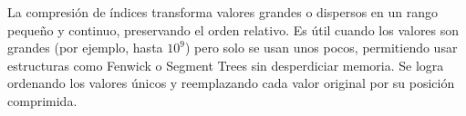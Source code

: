 {}
\markdownRendererSectionEnd \markdownRendererSectionBegin
{}\markdownRendererInterblockSeparator
{}La compresión de índices transforma valores grandes o dispersos en un rango pequeño y continuo, preservando el orden relativo. Es útil cuando los valores son grandes (por ejemplo, hasta $10^9$) pero solo se usan unos pocos, permitiendo usar estructuras como Fenwick o Segment Trees sin desperdiciar memoria. Se logra ordenando los valores únicos y reemplazando cada valor original por su posición comprimida.\markdownRendererInterblockSeparator
{}
\markdownRendererSectionEnd 
\markdownRendererSectionEnd \markdownRendererDocumentEnd